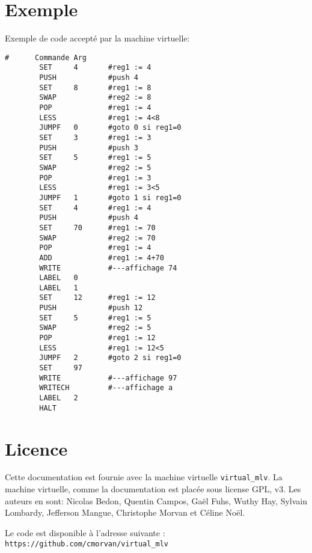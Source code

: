 \documentclass[12pt,a4paper]{article}
\begin{document}
\section{Exemple}
Exemple de code accepté par la machine virtuelle:
\begin{verbatim}
#      Commande Arg
        SET     4       #reg1 := 4
        PUSH            #push 4
        SET     8       #reg1 := 8
        SWAP            #reg2 := 8
        POP             #reg1 := 4
        LESS            #reg1 := 4<8
        JUMPF   0       #goto 0 si reg1=0
        SET     3       #reg1 := 3
        PUSH            #push 3
        SET     5       #reg1 := 5
        SWAP            #reg2 := 5
        POP             #reg1 := 3
        LESS            #reg1 := 3<5
        JUMPF   1       #goto 1 si reg1=0
        SET     4       #reg1 := 4
        PUSH            #push 4
        SET     70      #reg1 := 70
        SWAP            #reg2 := 70
        POP             #reg1 := 4
        ADD             #reg1 := 4+70
        WRITE           #---affichage 74
        LABEL   0
        LABEL   1
        SET     12      #reg1 := 12
        PUSH            #push 12
        SET     5       #reg1 := 5
        SWAP            #reg2 := 5
        POP             #reg1 := 12 
        LESS            #reg1 := 12<5
        JUMPF   2       #goto 2 si reg1=0
        SET     97
        WRITE           #---affichage 97
        WRITECH         #---affichage a
        LABEL   2
        HALT
\end{verbatim}

\section{Licence}

Cette documentation est fournie avec la machine virtuelle
\texttt{virtual\_mlv}. La machine virtuelle, comme la documentation
est placée sous license GPL, v3. Les auteurs en sont: Nicolas Bedon,
Quentin Campos, Gaël Fuhs, Wuthy Hay, Sylvain Lombardy, Jefferson
Mangue, Christophe Morvan et Céline Noël.

Le code est disponible à l'adresse suivante :
\texttt{https://github.com/cmorvan/virtual\_mlv}
\end{document}
